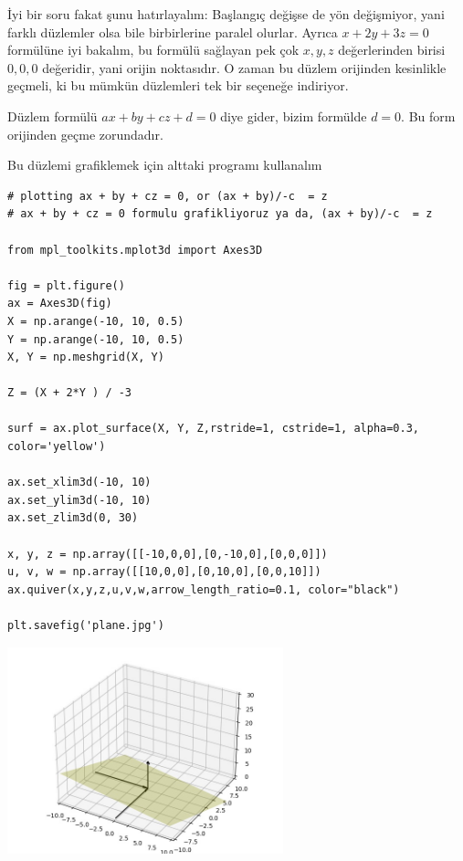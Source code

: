 \documentclass[12pt,fleqn]{article}\usepackage{../../common}
\begin{document}
İyi bir soru fakat şunu hatırlayalım: Başlangıç değişse de yön değişmiyor,
yani farklı düzlemler olsa bile birbirlerine paralel olurlar. Ayrıca $x +
2y + 3z = 0$ formülüne iyi bakalım, bu formülü sağlayan pek çok $x,y,z$
değerlerinden birisi $0,0,0$ değeridir, yani orijin noktasıdır. O zaman bu
düzlem orijinden kesinlikle geçmeli, ki bu mümkün düzlemleri tek bir
seçeneğe indiriyor.

Düzlem formülü $ax + by + cz + d= 0$ diye gider, bizim formülde $d=0$. Bu
form orijinden geçme zorundadır.

Bu düzlemi grafiklemek için alttaki programı kullanalım

\begin{verbatim}
# plotting ax + by + cz = 0, or (ax + by)/-c  = z 
# ax + by + cz = 0 formulu grafikliyoruz ya da, (ax + by)/-c  = z 

from mpl_toolkits.mplot3d import Axes3D

fig = plt.figure()
ax = Axes3D(fig)
X = np.arange(-10, 10, 0.5)
Y = np.arange(-10, 10, 0.5)
X, Y = np.meshgrid(X, Y)

Z = (X + 2*Y ) / -3

surf = ax.plot_surface(X, Y, Z,rstride=1, cstride=1, alpha=0.3, color='yellow')

ax.set_xlim3d(-10, 10)
ax.set_ylim3d(-10, 10)
ax.set_zlim3d(0, 30)

x, y, z = np.array([[-10,0,0],[0,-10,0],[0,0,0]])
u, v, w = np.array([[10,0,0],[0,10,0],[0,0,10]])
ax.quiver(x,y,z,u,v,w,arrow_length_ratio=0.1, color="black")

plt.savefig('plane.jpg')
\end{verbatim}

\includegraphics[height=6cm]{plane.jpg}
\end{document}
